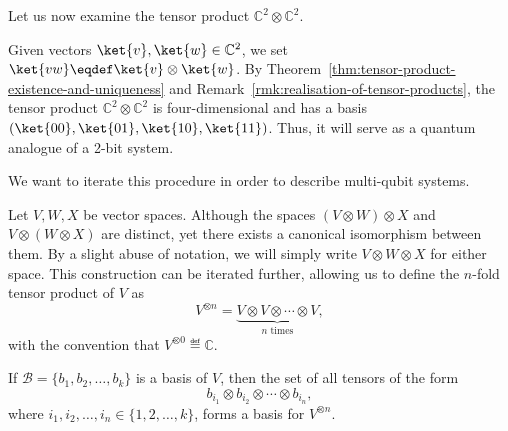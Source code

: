 \documentclass[a4paper,oneside, 12pt]{amsart}
\begin{document}
Let us now examine the tensor product \( \mathbb{C}^2 \otimes \mathbb{C}^2 \).
\begin{example}\label{ex:c2-otimes-c2}
  Given vectors \(\ket{v}, \ket{w} \in \mathbb{C}^{2}\), we set \(\ket{vw} \eqdef \ket{v} \otimes \ket{w}\).
  By Theorem~\ref{thm:tensor-product-existence-and-uniqueness} and Remark~\ref{rmk:realisation-of-tensor-products}, the tensor product \( \mathbb{C}^2 \otimes \mathbb{C}^2 \) is four-dimensional and has a basis \( (\ket{00}, \ket{01}, \ket{10}, \ket{11}) \).
  Thus, it will serve as a quantum analogue of a 2-bit system.
\end{example}

We want to iterate this procedure in order to describe multi-qubit systems.

\begin{remark}\label{rmk:iterated-tensor-products}
  Let \( V, W, X \) be vector spaces.
  Although the spaces \( (V \otimes W) \otimes X \) and \( V \otimes (W \otimes X) \) are distinct, yet there exists a canonical isomorphism between them.
  By a slight abuse of notation, we will simply write \( V \otimes W \otimes X \) for either space.
  This construction can be iterated further, allowing us to define the \( n \)-fold tensor product of \( V \) as
  \begin{equation}
    V^{\otimes n} = \underbrace{V \otimes V \otimes \cdots \otimes V}_{n \text{ times}},
  \end{equation}
  with the convention that \( V^{\otimes 0} \eqdef \mathbb{C} \).

  If \( \mathcal{B} = \{b_1, b_2, \ldots, b_k\} \) is a basis of \( V \), then the set of all tensors of the form
  \begin{equation*}
    b_{i_1} \otimes b_{i_2} \otimes \cdots \otimes b_{i_n},
  \end{equation*}
  where \( i_1, i_2, \ldots, i_n \in \{1, 2, \ldots, k\} \), forms a basis for \( V^{\otimes n} \).
\end{remark}
\end{document}
